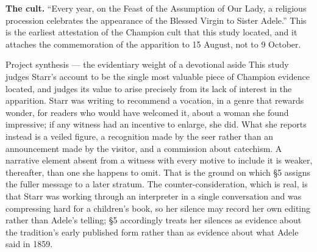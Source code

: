 \textbf{The cult.} ``Every year, on the Feast of the Assumption of Our
Lady, a religious procession celebrates the appearance of the Blessed
Virgin to Sister Adele.'' This is the earliest attestation of the
Champion cult that this study located, and it attaches the commemoration
of the apparition to 15 August, not to 9 October.

\begin{judgmentbox}{Project synthesis --- the evidentiary weight of a
devotional aside}
This study judges Starr's account to be the single most valuable piece
of Champion evidence located, and judges its value to arise precisely
from its lack of interest in the apparition. Starr was writing to
recommend a vocation, in a genre that rewards wonder, for readers who
would have welcomed it, about a woman she found impressive; if any
witness had an incentive to enlarge, she did. What she reports instead
is a veiled figure, a recognition made by the seer rather than an
announcement made by the visitor, and a commission about catechism. A
narrative element absent from a witness with every motive to include it
is weaker, thereafter, than one she happens to omit. That is the ground
on which \S5 assigns the fuller message to a later stratum. The
counter-consideration, which is real, is that Starr was working through
an interpreter in a single conversation and was compressing hard for a
children's book, so her silence may record her own editing rather than
Adele's telling; \S5 accordingly treats her silences as evidence about
the tradition's early published form rather than as evidence about what
Adele said in 1859.
\end{judgmentbox}

